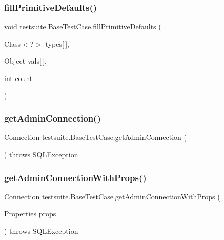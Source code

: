 \subsubsection{\texorpdfstring{fill\+Primitive\+Defaults()}{fillPrimitiveDefaults()}}
{\footnotesize\ttfamily void testsuite.\+Base\+Test\+Case.\+fill\+Primitive\+Defaults (\begin{DoxyParamCaption}\item[{Class$<$?$>$}]{types\mbox{[}$\,$\mbox{]},  }\item[{Object}]{vals\mbox{[}$\,$\mbox{]},  }\item[{int}]{count }\end{DoxyParamCaption})\hspace{0.3cm}{\ttfamily [protected]}}

\mbox{\label{classtestsuite_1_1_base_test_case_a5aac2df8b2b635a640bd2ca0f9df4f63}} 
\subsubsection{\texorpdfstring{get\+Admin\+Connection()}{getAdminConnection()}}
{\footnotesize\ttfamily Connection testsuite.\+Base\+Test\+Case.\+get\+Admin\+Connection (\begin{DoxyParamCaption}{ }\end{DoxyParamCaption}) throws S\+Q\+L\+Exception\hspace{0.3cm}{\ttfamily [protected]}}

\mbox{\label{classtestsuite_1_1_base_test_case_a1b9097dbfa04cb3fda0be74767ee8b02}} 
\subsubsection{\texorpdfstring{get\+Admin\+Connection\+With\+Props()}{getAdminConnectionWithProps()}}
{\footnotesize\ttfamily Connection testsuite.\+Base\+Test\+Case.\+get\+Admin\+Connection\+With\+Props (\begin{DoxyParamCaption}\item[{Properties}]{props }\end{DoxyParamCaption}) throws S\+Q\+L\+Exception\hspace{0.3cm}{\ttfamily [protected]}}


